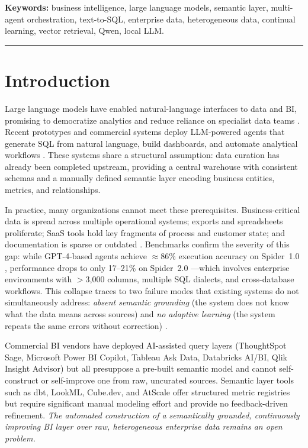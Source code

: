 \documentclass[11pt,a4paper]{article}
\begin{document}
\noindent\textbf{Keywords:} business intelligence, large language models,
semantic layer, multi-agent orchestration, text-to-SQL, enterprise data,
heterogeneous data, continual learning, vector retrieval, Qwen, local LLM.

\tableofcontents
\bigskip
\hrule
\bigskip

\section{Introduction}\label{sec:intro}

Large language models have enabled natural-language interfaces to data and BI,
promising to democratize analytics and reduce reliance on specialist data teams
\citep{gpt4_2023,minaee2024survey}.  Recent prototypes and commercial systems
deploy LLM-powered agents that generate SQL from natural language, build
dashboards, and automate analytical workflows \citep{rahman2025llm,jiang2024siriusbi}.
These systems share a structural assumption: data curation has already been
completed upstream, providing a central warehouse with consistent schemas and a
manually defined semantic layer encoding business entities, metrics, and
relationships.

In practice, many organizations cannot meet these prerequisites.  Business-critical
data is spread across multiple operational systems; exports and spreadsheets
proliferate; SaaS tools hold key fragments of process and customer state; and
documentation is sparse or outdated \citep{zhu2025data,various2025llmdata}.
Benchmarks confirm the severity of this gap: while GPT-4-based agents achieve
$\approx$86\% execution accuracy on Spider~1.0 \citep{yu2018spider}, performance
drops to only 17--21\% on Spider~2.0 \citep{lei2024spider2}---which involves
enterprise environments with $>$3,000 columns, multiple SQL dialects, and
cross-database workflows.  This collapse traces to two failure modes that existing
systems do not simultaneously address: \emph{absent semantic grounding} (the system
does not know what the data means across sources) and \emph{no adaptive learning}
(the system repeats the same errors without correction)
\citep{shi2024survey,chen2025agent}.

Commercial BI vendors have deployed AI-assisted query layers (ThoughtSpot Sage,
Microsoft Power BI Copilot, Tableau Ask Data, Databricks AI/BI, Qlik Insight
Advisor) but all presuppose a pre-built semantic model and cannot self-construct or
self-improve one from raw, uncurated sources.  Semantic layer tools such as dbt,
LookML, Cube.dev, and AtScale offer structured metric registries but require
significant manual modeling effort \citep{abai2024enterprise} and provide no
feedback-driven refinement.  \emph{The automated construction of a semantically
grounded, continuously improving BI layer over raw, heterogeneous enterprise data
remains an open problem.}
\end{document}

